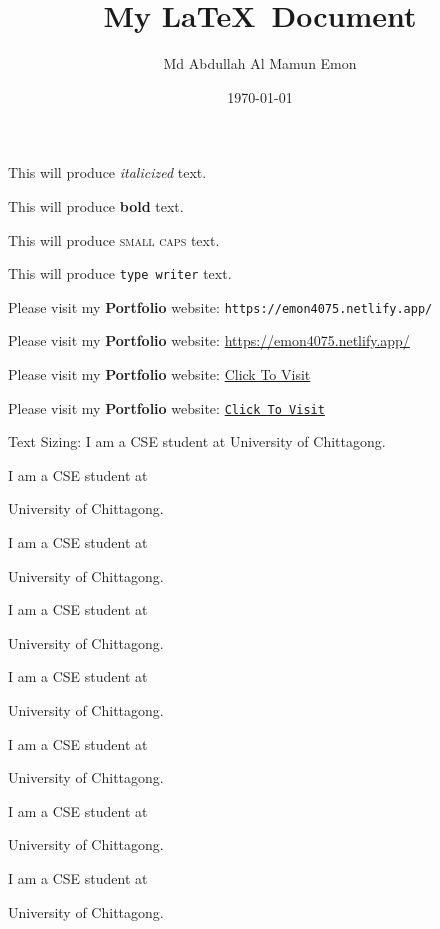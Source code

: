 \documentclass[11pt]{article}
\title{My \LaTeX\ Document}
\author{Md Abdullah Al Mamun Emon}
\date{\today}
\begin{document}
\tableofcontents
\maketitle %

This will produce \textit{italicized} text.

This will produce \textbf{bold} text.

This will produce \textsc{small caps} text.

This will produce \texttt{type writer} text.

Please visit my \textbf{Portfolio} website: \texttt{https://emon4075.netlify.app/}

Please visit my \textbf{Portfolio} website: \url{https://emon4075.netlify.app/}

Please visit my \textbf{Portfolio} website: \href{https://emon4075.netlify.app/}{Click To Visit}

Please visit my \textbf{Portfolio} website: \href{https://emon4075.netlify.app/}{\texttt{Click To Visit}}

\vspace{1cm}

Text Sizing:
I am a CSE student at University of Chittagong.

I am a CSE student at \begin{large}University of Chittagong.\end{large}

I am a CSE student at \begin{Large}University of Chittagong.\end{Large}

I am a CSE student at \begin{huge}University of Chittagong.\end{huge}

I am a CSE student at \begin{Huge}University of Chittagong.\end{Huge}

I am a CSE student at \begin{normalsize}University of Chittagong.\end{normalsize}

I am a CSE student at \begin{small}University of Chittagong.\end{small}

I am a CSE student at \begin{scriptsize}University of Chittagong.\end{scriptsize}
\end{document}
